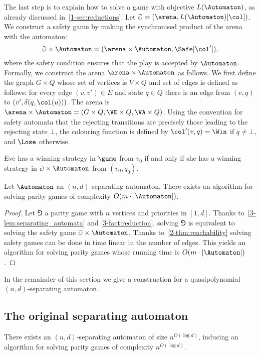 The last step is to explain how to solve a game with objective $L(\Automaton)$, as already discussed in~\cref{1-sec:reductions}.
Let $\Game = (\arena, L(\Automaton)[\col])$.
We construct a safety game by making the synchronised product of the arena with the automaton:
\[
\Game \times \Automaton = (\arena \times \Automaton, \Safe[\col']),
\]
where the safety condition ensures that the play is accepted by $\Automaton$.
Formally, we construct the arena $\arena \times \Automaton$ as follows.
We first define the graph $G \times Q$ whose set of vertices is $V \times Q$ and set of edges is defined as follows:
for every edge $(v,v') \in E$ and state $q \in Q$ there is an edge from $(v,q)$ to $(v',\delta(q,\col(u)))$.
The arena is $\arena \times \Automaton = (G \times Q, \VE \times Q, \VA \times Q)$.
Using the convention for safety automata that the rejecting transitions are precisely those leading to the rejecting state $\bot$,
the colouring function is defined by $\col'(v,q) = \Win$ if $q \neq \bot$, and $\Lose$ otherwise.

\begin{fact}
\label{3-fact:reduction}
Eve has a winning strategy in $\game$ from $v_0$ if and only if
she has a winning strategy in $\Game \times \Automaton$ from $(v_0,q_0)$.
\end{fact}

\begin{theorem}
\label{3-thm:algorithm_separating_automata}
Let $\Automaton$ an $(n,d)$-separating automaton.
There exists an algorithm for solving parity games of complexity $O(m \cdot |\Automaton|)$.
\end{theorem}
\begin{proof}
Let $\Game$ a parity game with $n$ vertices and priorities in $[1,d]$.
Thanks to~\cref{3-lem:separating_automata} and \cref{3-fact:reduction}, solving $\Game$
is equivalent to solving the safety game $\Game \times \Automaton$.
Thanks to~\cref{2-thm:reachability} solving safety games can be done in time linear in the number of edges.
This yields an algorithm for solving parity games whose running time is $O(m \cdot |\Automaton|)$.
\end{proof}

In the remainder of this section we give a construction for a quasipolynomial $(n,d)$-separating automaton.

\subsection*{The original separating automaton}
\begin{theorem}
\label{3-thm:original_separating_automaton}
There exists an $(n,d)$-separating automaton of size $n^{O(\log d)}$,
inducing an algorithm for solving parity games of complexity $n^{O(\log d)}$.
\end{theorem}

